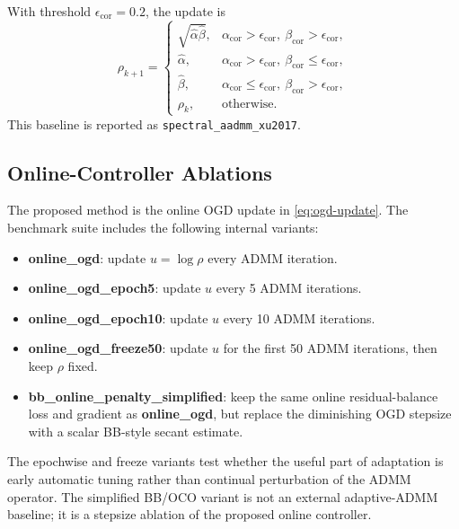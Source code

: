 \documentclass[11pt]{article}
\begin{document}
With threshold $\epsilon_{\mathrm{cor}}=0.2$, the update is
\begin{equation}
    \rho_{k+1}
    =
    \begin{cases}
        \sqrt{\widehat{\alpha}\widehat{\beta}},
        & \alpha_{\mathrm{cor}}>\epsilon_{\mathrm{cor}},
          \ \beta_{\mathrm{cor}}>\epsilon_{\mathrm{cor}},\\
        \widehat{\alpha},
        & \alpha_{\mathrm{cor}}>\epsilon_{\mathrm{cor}},
          \ \beta_{\mathrm{cor}}\le\epsilon_{\mathrm{cor}},\\
        \widehat{\beta},
        & \alpha_{\mathrm{cor}}\le\epsilon_{\mathrm{cor}},
          \ \beta_{\mathrm{cor}}>\epsilon_{\mathrm{cor}},\\
        \rho_k, & \text{otherwise}.
    \end{cases}
\end{equation}
This baseline is reported as \texttt{spectral\_aadmm\_xu2017}.

\subsection{Online-Controller Ablations}

The proposed method is the online OGD update in \eqref{eq:ogd-update}.  The
benchmark suite includes the following internal variants:
\begin{itemize}
    \item \textbf{online\_ogd}: update $u=\log\rho$ every ADMM iteration.
    \item \textbf{online\_ogd\_epoch5}: update $u$ every 5 ADMM iterations.
    \item \textbf{online\_ogd\_epoch10}: update $u$ every 10 ADMM iterations.
    \item \textbf{online\_ogd\_freeze50}: update $u$ for the first 50 ADMM
          iterations, then keep $\rho$ fixed.
    \item \textbf{bb\_online\_penalty\_simplified}: keep the same online
          residual-balance loss and gradient as \textbf{online\_ogd}, but
          replace the diminishing OGD stepsize with a scalar BB-style secant
          estimate.
\end{itemize}
The epochwise and freeze variants test whether the useful part of adaptation
is early automatic tuning rather than continual perturbation of the ADMM
operator.  The simplified BB/OCO variant is not an external adaptive-ADMM
baseline; it is a stepsize ablation of the proposed online controller.
\end{document}
